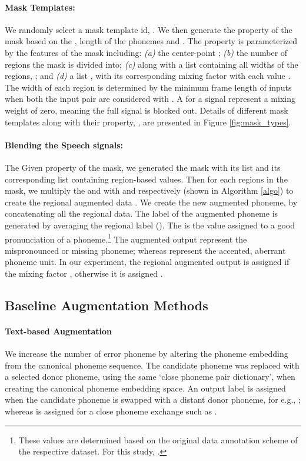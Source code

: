 \documentclass{INTERSPEECH2023}
\begin{document}
\paragraph*{Mask Templates:}  
We randomly select a mask template id, . We then generate the property  of the mask based on the , length of the phonemes  and . The property  is parameterized by the features of the mask including: \textit{(a)} the center-point ; \textit{(b)} the number of regions  the mask is divided into; \textit{(c)} along with a list containing all widths of the regions, ; and \textit{(d)} a list , with its corresponding mixing factor with each value . The width of each region is determined by the minimum frame length of inputs when both the input pair are considered with . A  for a signal represent a mixing weight of zero, meaning the full signal is blocked out.
Details of different mask templates along with their property, , are presented in Figure \ref{fig:mask_types}.  



\paragraph*{Blending the Speech signals:} 
The Given property  of the mask, we generated the mask with its  list and its corresponding  list containing region-based  values. Then for each regions in the mask, we multiply the  and  with  and  respectively (shown in Algorithm \ref{algo}) to create the regional augmented data . We create the new augmented phoneme,  by concatenating all the  regional data.
The label  of the augmented phoneme  is generated by averaging the regional label (). The  is the value assigned to a good pronunciation of a phoneme.\footnote{These values are determined based on the original data annotation scheme of the respective dataset. For this study, .} The augmented output  represent the mispronounced or missing phoneme; whereas  represent the accented, aberrant phoneme unit. In our experiment, the regional augmented output is assigned  if the mixing factor , otherwise it is assigned .



\subsection{Baseline Augmentation Methods}
\paragraph*{Text-based Augmentation}
We increase the number of error phoneme by altering the phoneme embedding from the canonical phoneme sequence. The candidate phoneme was replaced with a selected donor phoneme, using the same `close phoneme pair dictionary', when creating the canonical phoneme embedding space. An output label  is assigned when the candidate phoneme is swapped with a distant donor phoneme, for e.g., ; whereas  is assigned for a close phoneme exchange such as .
\end{document}
